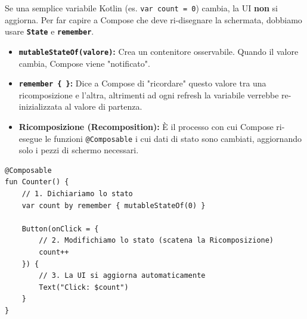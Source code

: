 \begin{center}
\end{center}

Se una semplice variabile Kotlin (es. \texttt{var count = 0}) cambia, la UI \textbf{non} si aggiorna.
Per far capire a Compose che deve ri-disegnare la schermata, dobbiamo usare \textbf{\texttt{State}} e \textbf{\texttt{remember}}.

\begin{itemize}
    \item \textbf{\texttt{mutableStateOf(valore)}:} Crea un contenitore osservabile.
    Quando il valore cambia, Compose viene "notificato".
    \item \textbf{\texttt{remember \{ \}}:} Dice a Compose di "ricordare" questo valore tra una ricomposizione e l'altra,
    altrimenti ad ogni refresh la variabile verrebbe re-inizializzata al valore di partenza.
    \item \textbf{Ricomposizione (Recomposition):} È il processo con cui Compose ri-esegue le funzioni \texttt{@Composable} i
    cui dati di stato sono cambiati, aggiornando solo i pezzi di schermo necessari.
\end{itemize}

\begin{lstlisting}[caption={Gestione corretta dello Stato}, label={lst:compose_state}]
@Composable
fun Counter() {
    // 1. Dichiariamo lo stato
    var count by remember { mutableStateOf(0) }

    Button(onClick = {
        // 2. Modifichiamo lo stato (scatena la Ricomposizione)
        count++
    }) {
        // 3. La UI si aggiorna automaticamente
        Text("Click: $count")
    }
}
\end{lstlisting}

